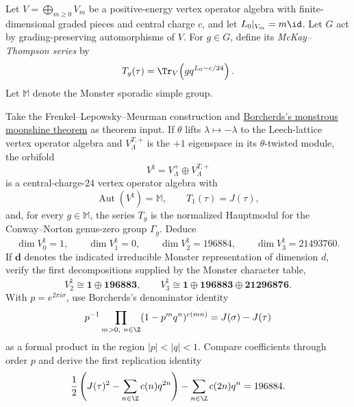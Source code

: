 \begin{exercise}
Let $V=\bigoplus_{m\geq0}V_m$ be a positive-energy vertex operator algebra
with finite-dimensional graded pieces and central charge $c$, and let
$L_0|_{V_m}=m\id$.  Let $G$ act by grading-preserving automorphisms of $V$.
For $g\in G$, define its \emph{McKay--Thompson series} by
\[
T_g(\tau)=\Tr_V\!\left(gq^{L_0-c/24}\right).
\]
Let $\mathbb M$ denote the Monster sporadic simple group.

Take the Frenkel--Lepowsky--Meurman construction and
\href{https://doi.org/10.1007/BF01232032}{Borcherds's monstrous moonshine
theorem} as theorem input.  If $\theta$ lifts $\lambda\mapsto-\lambda$ to the
Leech-lattice vertex operator algebra and $V_\Lambda^{T,+}$ is the
$+1$ eigenspace in its $\theta$-twisted module, the orbifold
\[
V^\natural=V_\Lambda^+\oplus V_\Lambda^{T,+}
\]
is a central-charge-$24$ vertex operator algebra with
\[
\operatorname{Aut}(V^\natural)=\mathbb M,
\qquad
T_1(\tau)=J(\tau),
\]
and, for every $g\in\mathbb M$, the series $T_g$ is the normalized Hauptmodul
for the Conway--Norton genus-zero group $\Gamma_g$.  Deduce
\[
\dim V^\natural_0=1,
\qquad
\dim V^\natural_1=0,
\qquad
\dim V^\natural_2=196884,
\qquad
\dim V^\natural_3=21493760.
\]
If $\mathbf d$ denotes the indicated irreducible Monster representation of
dimension $d$, verify the first decompositions supplied by the Monster
character table,
\[
V^\natural_2\cong\mathbf1\oplus\mathbf{196883},
\qquad
V^\natural_3\cong
\mathbf1\oplus\mathbf{196883}\oplus\mathbf{21296876}.
\]
With $p=e^{2\pi i\sigma}$, use Borcherds's denominator identity
\[
p^{-1}\prod_{m>0,\ n\in\Z}
(1-p^mq^n)^{c(mn)}=J(\sigma)-J(\tau)
\]
as a formal product in the region $|p|<|q|<1$.  Compare coefficients through
order $p$ and derive the first replication identity
\[
\frac12\left(J(\tau)^2-\sum_{n\in\Z}c(n)q^{2n}\right)
-\sum_{n\in\Z}c(2n)q^n=196884.
\]
\end{exercise}

